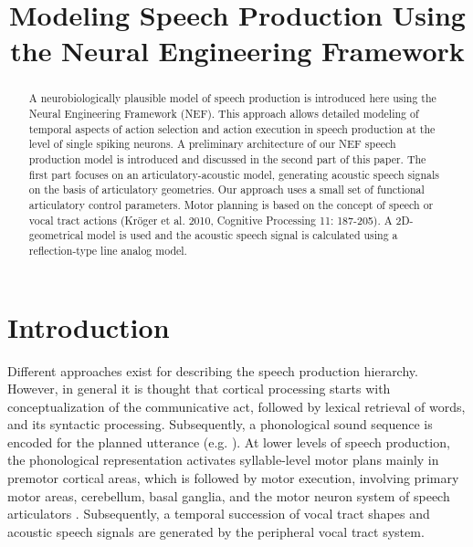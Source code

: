 \documentclass[conference]{IEEEtran}
\begin{document}
\title{Modeling Speech Production Using\\
  the Neural Engineering Framework}

\author{
\and
{}
}

\maketitle

\begin{abstract}
  A neurobiologically plausible model of speech production is
  introduced here using the Neural Engineering Framework (NEF).
  This approach allows
  detailed modeling of temporal aspects of action selection and action
  execution in speech production  at the level of single spiking neurons.
  A preliminary architecture of our
  NEF speech production model is introduced and discussed in
  the second part of this paper. The first part focuses on an
  articulatory-acoustic model, generating acoustic speech signals on
  the basis of articulatory geometries. Our approach uses a small set
  of functional articulatory control parameters. Motor
  planning is based on the concept of speech or vocal tract actions
  (Kr\"{o}ger et al. 2010, Cognitive Processing 11: 187-205). A
  2D-geometrical model is used and the acoustic speech signal is
  calculated using a reflection-type line analog model.
\end{abstract}

\IEEEpeerreviewmaketitle

\section{Introduction}

Different approaches exist for describing the speech production
hierarchy. However, in general it is thought that
cortical processing starts with conceptualization of the
communicative act, followed by lexical retrieval of words, and its
syntactic processing. Subsequently, a phonological sound sequence is
encoded for the planned utterance (e.g. \cite{levelt1999}). At lower
levels of speech production, the phonological representation activates
syllable-level motor plans mainly in premotor cortical areas, which is
followed by motor execution, involving primary motor areas,
cerebellum, basal ganglia, and the motor neuron system of
speech articulators \cite{riecker2005}. Subsequently, a temporal
succession of vocal tract shapes and acoustic speech signals are
generated by the peripheral vocal tract system.
\end{document}
